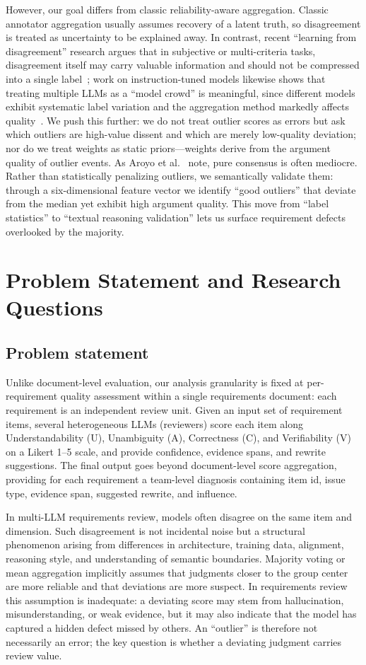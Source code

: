 \documentclass[sn-mathphys-num]{sn-jnl}
\begin{document}
However, our goal differs from classic reliability-aware aggregation. Classic annotator aggregation usually assumes recovery of a latent truth, so disagreement is treated as uncertainty to be explained away. In contrast, recent ``learning from disagreement'' research argues that in subjective or multi-criteria tasks, disagreement itself may carry valuable information and should not be compressed into a single label~\cite{ref25}; work on instruction-tuned models likewise shows that treating multiple LLMs as a ``model crowd'' is meaningful, since different models exhibit systematic label variation and the aggregation method markedly affects quality~\cite{ref26}. We push this further: we do not treat outlier scores as errors but ask which outliers are high-value dissent and which are merely low-quality deviation; nor do we treat weights as static priors---weights derive from the argument quality of outlier events. As Aroyo et al.~\cite{ref23} note, pure consensus is often mediocre. Rather than statistically penalizing outliers, we semantically validate them: through a six-dimensional feature vector we identify ``good outliers'' that deviate from the median yet exhibit high argument quality. This move from ``label statistics'' to ``textual reasoning validation'' lets us surface requirement defects overlooked by the majority.

\section{Problem Statement and Research Questions}\label{sec:problem}

\subsection{Problem statement}
Unlike document-level evaluation, our analysis granularity is fixed at per-requirement quality assessment within a single requirements document: each requirement is an independent review unit. Given an input set of requirement items, several heterogeneous LLMs (reviewers) score each item along Understandability (U), Unambiguity (A), Correctness (C), and Verifiability (V) on a Likert 1--5 scale, and provide confidence, evidence spans, and rewrite suggestions. The final output goes beyond document-level score aggregation, providing for each requirement a team-level diagnosis containing item id, issue type, evidence span, suggested rewrite, and influence.

In multi-LLM requirements review, models often disagree on the same item and dimension. Such disagreement is not incidental noise but a structural phenomenon arising from differences in architecture, training data, alignment, reasoning style, and understanding of semantic boundaries. Majority voting or mean aggregation implicitly assumes that judgments closer to the group center are more reliable and that deviations are more suspect. In requirements review this assumption is inadequate: a deviating score may stem from hallucination, misunderstanding, or weak evidence, but it may also indicate that the model has captured a hidden defect missed by others. An ``outlier'' is therefore not necessarily an error; the key question is whether a deviating judgment carries review value.
\end{document}
